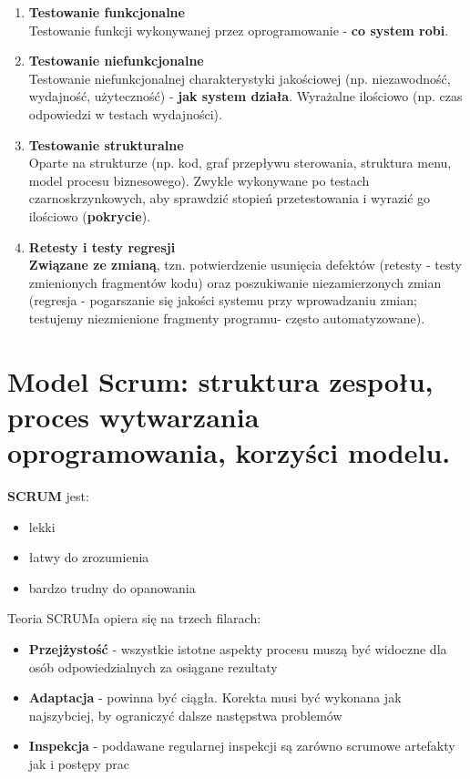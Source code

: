 \documentclass[12pt]{article}
\begin{document}
    \begin{enumerate}
        \item  \textbf{Testowanie funkcjonalne}\\
        Testowanie funkcji wykonywanej przez oprogramowanie - \textbf{co system robi}.

        \item \textbf{Testowanie niefunkcjonalne}\\
        Testowanie niefunkcjonalnej charakterystyki jakościowej (np. niezawodność, wydajność,
        użyteczność) - \textbf{jak system działa}. Wyrażalne ilościowo (np. czas odpowiedzi w testach wydajności).

        \item \textbf{Testowanie strukturalne}\\
        Oparte na strukturze (np. kod, graf przepływu sterowania, struktura menu, model procesu biznesowego).
        Zwykle wykonywane po testach czarnoskrzynkowych, aby sprawdzić stopień przetestowania i wyrazić go ilościowo
        (\textbf{pokrycie}).

        \item \textbf{Retesty i testy regresji}\\
        \textbf{Związane ze zmianą}, tzn. potwierdzenie usunięcia defektów (retesty - testy zmienionych fragmentów kodu)
        oraz poszukiwanie niezamierzonych zmian (regresja - pogarszanie się jakości systemu przy wprowadzaniu zmian;
        testujemy niezmienione fragmenty programu- często automatyzowane).
    \end{enumerate}

    \newpage

    \section{Model Scrum: struktura zespołu, proces wytwarzania oprogramowania, korzyści modelu.}
    \begin{definition}
        \textbf{SCRUM} jest:
        \begin{itemize}
            \item lekki
            \item łatwy do zrozumienia
            \item bardzo trudny do opanowania
        \end{itemize}

        Teoria SCRUMa opiera się na trzech filarach:
        \begin{itemize}
            \item \textbf{Przejżystość} - wszystkie istotne aspekty procesu muszą być widoczne dla osób odpowiedzialnych za osiągane rezultaty
            \item \textbf{Adaptacja} - powinna być ciągła. Korekta musi być wykonana jak najszybciej, by ograniczyć dalsze następstwa problemów
            \item \textbf{Inspekcja} - poddawane regularnej inspekcji są zarówno scrumowe artefakty jak i postępy prac
        \end{itemize}
    \end{definition}
    
\end{document}
